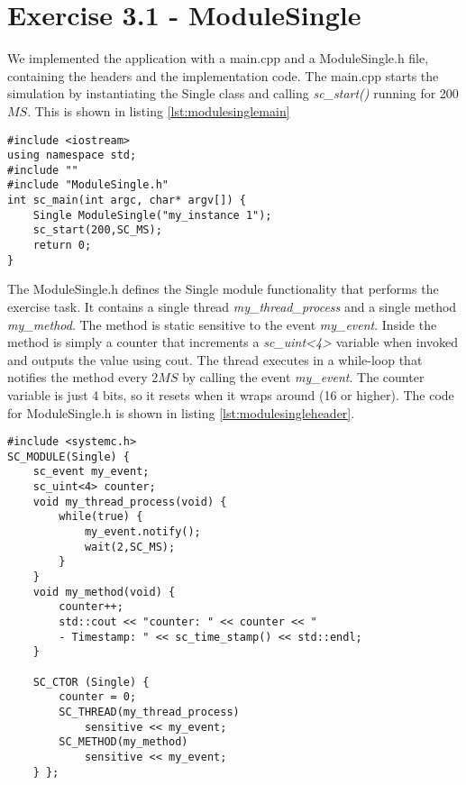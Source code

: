\section{Exercise 3.1 - ModuleSingle}

We implemented the application with a main.cpp and a ModuleSingle.h file, containing the headers and the implementation code. The main.cpp starts the simulation by instantiating the Single class and calling \textit{sc\_start()} running for 200$MS$. This is shown in listing \ref{lst:modulesinglemain}

\begin{lstlisting}[style=customc++, caption=Application file for ModuleSingle,
label={lst:modulesinglemain}]
#include <iostream>
using namespace std;
#include ""
#include "ModuleSingle.h"
int sc_main(int argc, char* argv[]) {
	Single ModuleSingle("my_instance 1");
	sc_start(200,SC_MS);
	return 0;
}
\end{lstlisting}

\noindent The ModuleSingle.h defines the Single module functionality that performs the exercise task. It contains a single thread \textit{my\_thread\_process} and a single method \textit{my\_method}. The method is static sensitive to the event \textit{my\_event}. Inside the method is simply a counter that increments a \textit{sc\_uint<4>} variable when invoked and outputs the value using cout. The thread executes in a while-loop that notifies the method every 2$MS$ by calling the event \textit{my\_event}. The counter variable is just 4 bits, so it resets when it wraps around (16 or higher). The code for ModuleSingle.h is shown in listing \ref{lst:modulesingleheader}.

\begin{lstlisting}[style=customc++, caption=Implementation of ModuleSingle,
label={lst:modulesingleheader}]
#include <systemc.h>
SC_MODULE(Single) {
	sc_event my_event;
	sc_uint<4> counter;
	void my_thread_process(void) {
		while(true) {
			my_event.notify();
			wait(2,SC_MS);
		}
	}
	void my_method(void) {
		counter++;
		std::cout << "counter: " << counter << "
		- Timestamp: " << sc_time_stamp() << std::endl;
	}
	
	SC_CTOR (Single) {
		counter = 0;
		SC_THREAD(my_thread_process)
			sensitive << my_event;
		SC_METHOD(my_method)
			sensitive << my_event;
	} };
\end{lstlisting}